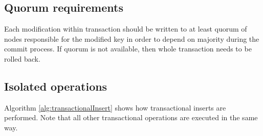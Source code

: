 \subsection{Quorum requirements}
Each modification within transaction should be written to at least quorum of nodes responsible for the modified key in order to depend on majority during the commit process. If quorum is not available, then whole transaction needs to be rolled back. 

\subsection{Isolated operations}
Algorithm \ref{alg:transactionalInsert} shows how transactional inserts are performed. Note that all other transactional operations are executed in the same way. 

    


